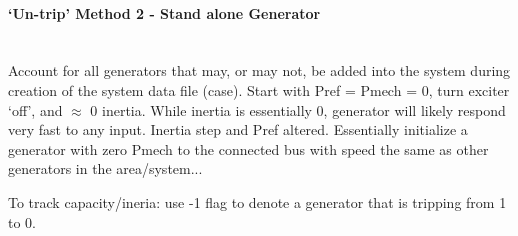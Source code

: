 \documentclass[12pt]{article}
\begin{document}
\paragraph{`Un-trip' Method 2 - Stand alone Generator } \ \\
Account for all generators that may, or may not, be added into the system during creation of the system data file (case).
Start with Pref = Pmech = 0, turn exciter `off', and $\approx$ 0 inertia.
While inertia is essentially 0, generator will likely respond very fast to any input.
Inertia step and Pref altered.
Essentially initialize a generator with zero Pmech to the connected bus with speed the same as other generators in the area/system...

To track capacity/ineria: use -1 flag to denote a generator that is tripping from 1 to 0.
\end{document}
